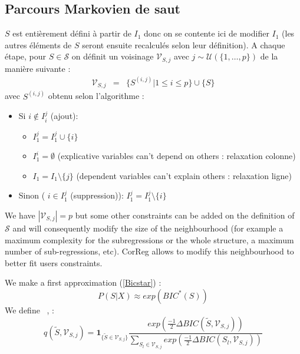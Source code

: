 \documentclass[12pt]{article}
\begin{document}
	\subsection{Parcours Markovien de saut}
	$S$ est entièrement d\'efini à partir de $I_1$ donc on se contente ici de modifier $I_1$ (les autres \'el\'ements de $S$ seront ensuite recalcul\'es selon leur d\'efinition).
	A chaque \'etape, pour $S \in \mathcal{S}$ on d\'efinit un voisinage $\mathcal{V}_{S,j}$ avec $j \sim \mathcal{U}(\{1,\dots,p\}) $ de la manière suivante  :	
	\begin{eqnarray}
		\mathcal{V}_{S,j}&=&\{ S^{(i,j)} | 1\leq i\leq p \} \cup\{S \}
	\end{eqnarray}	
	avec $S^{(i,j)}$ obtenu selon l'algorithme :
	\begin{itemize}
		\item Si $i \notin I_i^j$ (ajout): 
			\begin{itemize}
				\item $I_1^j=I_1^j\cup \{i\}$
				\item $I_1^i=\emptyset$ (explicative variables can't depend on others : relaxation colonne)
				\item $I_1=I_1 \setminus \{j\}$ (dependent variables can't explain others : relaxation ligne) 
			\end{itemize}			 
		\item Sinon ( $i \in I_1^j$ (suppression)): $I_1^j=I_1^j\setminus \{i\}$
	\end{itemize}
	
	We have $|\mathcal{V}_{S,j}|=p$ but some other constraints can be added on the definition of $\mathcal{S}$ and will consequently modify the size of the neighbourhood (for example a maximum complexity for the subregressions or the whole structure, a maximum number of sub-regressions, etc). CorReg allows to modify this neighbourhood to better fit users constraints. 
	
		
	We make a first approximation (\ref{Bicstar}) : 
	\begin{equation}
		P(S|X)\approx exp(BIC^*(S))
	\end{equation}
	We define ~\cite{BIChuard}, :
	\begin{equation}
		q(\tilde{S},\mathcal{V}_{S,j})=\mathbf{1}_{ \{\tilde{S}\in \mathcal{V}_{S,j}\} }\frac{exp(\frac{-1}{2}\Delta BIC(\tilde{S},\mathcal{V}_{S,j}))}{\sum_{S_l\in \mathcal{V}_{S,j}}exp(\frac{-1}{2}\Delta BIC(S_l,\mathcal{V}_{S,j}))}
	\end{equation}
	
\end{document}
